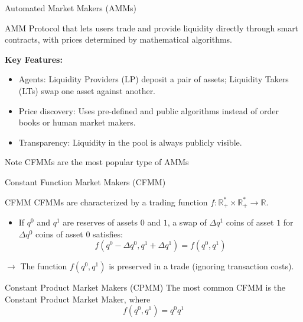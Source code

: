 \documentclass[10pt]{beamer}
\begin{document}


\begin{frame}{Automated Market Makers (AMMs)}

\begin{block}{AMM}
Protocol that lets users trade and provide liquidity directly through smart contracts, with prices determined by mathematical algorithms.
\end{block}\pause

\textbf{Key Features:}\pause
\begin{itemize}
  \item Agents: Liquidity Providers (LP) deposit a pair of assets; Liquidity Takers (LTs) swap one asset against another.
  \item Price discovery: Uses pre-defined and public algorithms instead of order books or human market makers.
  \item Transparency: Liquidity in the pool is always publicly visible.
\end{itemize}

\begin{alertblock}{Note}
CFMMs are the most popular type of AMMs
\end{alertblock}

\end{frame}


\begin{frame}{Constant Function Market Makers (CFMM)}

\begin{block}{CFMM}
  CFMMs are characterized by a trading function $f: \mathbb{R}_+^* \times \mathbb{R}_+^* \to \mathbb{R}$.
  \begin{itemize}\setlength\itemsep{0.8em}
    \item If $q^0$ and $q^1$ are reserves of assets $0$ and $1$, a swap of $\Delta q^1$ coins of asset $1$ for $\Delta q^0$ coins of asset $0$ satisfies:
    $$f(q^0 - \Delta q^0, q^1 + \Delta q^1) = f(q^0, q^1)$$
  \end{itemize}
$\rightarrow$ The function $f(q^0, q^1)$ is preserved in a trade (ignoring transaction costs).
\end{block}\pause

\begin{exampleblock}{Constant Product Market Makers (CPMM)}
  The most common CFMM is the Constant Product Market Maker, where 
  $$f(q^0, q^1) = q^0 q^1$$
\end{exampleblock}

\end{frame}
\end{document}
